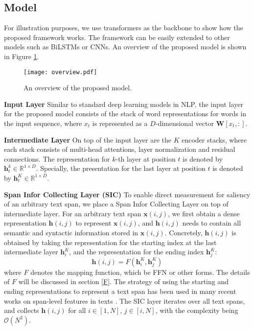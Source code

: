 \documentclass[11pt,a4paper]{article}
\begin{document}
\subsection{Model}
For illustration purposes, we use transformers \cite{vaswani2017attention} as the backbone to show how the proposed framework works. The framework can be easily extended to other models such as BiLSTMs or CNNs. An overview of the proposed model is shown in Figure \ref{fig:overview}.

\begin{figure}
    \centering
    \texttt{[image: overview.pdf]}
    \caption{An overview of the proposed model.}
    \label{fig:overview}
\end{figure}

{\bf Input Layer} Similar to standard deep learning models in NLP, the input layer for the proposed model consists of the stack of word representations for words in the input sequence, where $x_t$ is represented as a $D$-dimensional vector $\bm{W}[x_t, :]$. 

{\bf Intermediate Layer}
On top of the input layer are the $K$ encoder stacks, where each stack consists of multi-head attentions, layer normalization and residual connections. 
The representation for $k$-th layer at position $t$ is denoted by $\bm{h}_t^k \in \mathbb{R}^{1\times D}$. 
Specially, the presentation for the last layer at position $t$ is denoted by $\bm{h}_t^K \in \mathbb{R}^{1\times D}$. 

{\bf Span Infor Collecting Layer (SIC)}
To enable direct measurement for saliency of an arbitrary text span, we place a Span Infor Collecting Layer on top of intermediate layer. 
For an arbitrary text span $\bm{x}(i,j)$, we first obtain a dense representation $\bm{h}(i,j)$ to represent $\bm{x}(i,j)$, and $\bm{h}(i,j)$ needs to contain all
semantic and syntactic 
 information stored in $\bm{x}(i,j)$. 
Concretely, $\bm{h}(i,j)$ is obtained by taking the representation for the starting index at the last intermediate layer $\bm{h}^K_i$, and the representation for the ending index $\bm{h}^K_j$:
 \begin{equation}
  \bm{h}(i,j) = F(\bm{h}^K_i, \bm{h}^K_j)
 \label{combine}
 \end{equation}
where $F$ denotes the mapping function, which be FFN or other forms.
The details of $F$ will be discussed in section \ref{F}. The strategy of using the starting and ending representations to represent a text span has been used in many recent works on  span-level features in texts \cite{li2019unified,joshi2020spanbert,wu2019coreference}.
The SIC layer iterates over all text spans, and collects $\bm{h}(i,j)$ for all $i\in [1,N]$, $j\in [i,N]$, with the complexity being $\mathcal{O}(N^2)$. 
\end{document}
